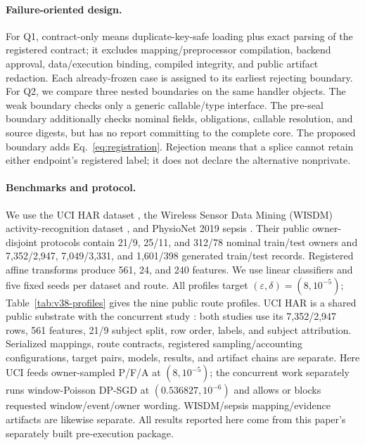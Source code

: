\documentclass[letterpaper]{article}
\begin{document}
\paragraph{Failure-oriented design.}
For Q1, contract-only means duplicate-key-safe loading plus exact parsing of
the registered contract; it excludes mapping/preprocessor compilation,
backend approval, data/execution binding, compiled integrity, and public
artifact redaction.  Each already-frozen case is assigned to its earliest
rejecting boundary.  For Q2, we compare three nested boundaries on the same
handler objects.  The weak boundary checks only a generic callable/type
interface.  The pre-seal boundary additionally checks nominal fields,
obligations, callable resolution, and source digests, but has no report
committing to the complete core.  The proposed boundary adds
Eq.~\eqref{eq:registration}.  Rejection means that a splice cannot retain
either endpoint's registered label; it does not declare the alternative
nonprivate.

\paragraph{Benchmarks and protocol.}
We use the UCI HAR dataset
\citep{anguita2013har,ucihar2013dataset}, the Wireless Sensor Data Mining (WISDM)
activity-recognition dataset
\citep{kwapisz2011activity}, and PhysioNet 2019 sepsis
\citep{physionet2019sepsis,reyna2020sepsis,pollard2026physionet,goldberger2000physionet}.  Their public owner-disjoint
protocols contain 21/9, 25/11, and 312/78 nominal train/test owners and
7,352/2,947, 7,049/3,331, and 1,601/398 generated train/test records.
Registered affine transforms produce 561, 24, and 240 features.  We use linear
classifiers and five fixed seeds per dataset and route.  All profiles target
$(\varepsilon,\delta)=(8,10^{-5})$; Table~\ref{tab:v38-profiles} gives the
nine public route profiles.  UCI HAR is a shared public substrate with the
concurrent study \citep{anonymous2026audit}: both studies
use its 7,352/2,947 rows, 561 features, 21/9 subject split, row order, labels,
and subject attribution.  Serialized mappings, route contracts, registered
sampling/accounting configurations, target pairs, models, results, and
artifact chains are separate.  Here UCI feeds owner-sampled P/F/A at
$(8,10^{-5})$; the concurrent work separately runs window-Poisson DP-SGD at
$(0.536827,10^{-6})$ and allows or blocks requested window/event/owner wording.
WISDM/sepsis mapping/evidence artifacts are likewise separate.  All results
reported here come from this paper's separately built pre-execution package.
\end{document}
